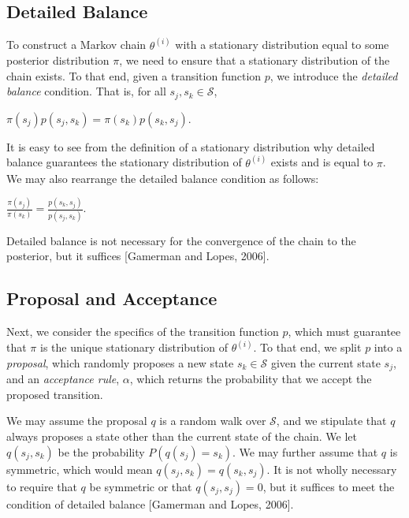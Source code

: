 \documentclass[12pt,twoside]{reedthesis}
\begin{document}
		\subsection*{Detailed Balance}
			To construct a Markov chain $\theta^{(i)}$ with a stationary distribution equal to some posterior distribution $\pi$, 
			we need to ensure that a stationary distribution of the chain exists. 
			To that end, given a transition function $p$, we introduce the {\em detailed balance} condition. 
			That is, for all $s_j, s_k \in \mathcal S$,
			\begin{center}
				$ \pi(s_j) p(s_j,s_k) = \pi(s_k) p(s_k,s_j)$.
			\end{center}
			It is easy to see from the definition of a stationary distribution why detailed balance guarantees the stationary distribution of $\theta^{(i)}$ exists and is equal to $\pi$. 
			We may also rearrange the detailed balance condition as follows:
			\begin{center}
				$\displaystyle \frac{\pi(s_j)}{\pi(s_k)} = \frac{p(s_k, s_j)}{p(s_j, s_k)}$.
			\end{center}
			Detailed balance is not necessary for the convergence of the chain to the posterior, but it suffices [Gamerman and Lopes, 2006]. 
		\subsection*{Proposal and Acceptance}
			Next, we consider the specifics of the transition function $p$, which must guarantee that $\pi$ is the unique stationary distribution of $\theta^{(i)}$.
			To that end, we split $p$ into a {\em proposal}, which randomly proposes a new state $s_k \in\mathcal S$ given the current state $s_j$, and an {\em acceptance rule}, $\alpha$, which returns the probability that we accept the proposed transition.
			
			We may assume the proposal $q$ is a random walk over $\mathcal S$, 
			and we stipulate that $q$ always proposes a state other than the current state of the chain.
			We let $q(s_j,s_k)$ be the probability $P(q(s_j) = s_k)$.
			We may further assume that $q$ is symmetric, which would mean $q(s_j,s_k) = q(s_k,s_j)$.
			It is not wholly necessary to require that $q$ be symmetric or that $q(s_j,s_j) = 0$, but it suffices to meet the condition of detailed balance [Gamerman and Lopes, 2006].
			
\end{document}
